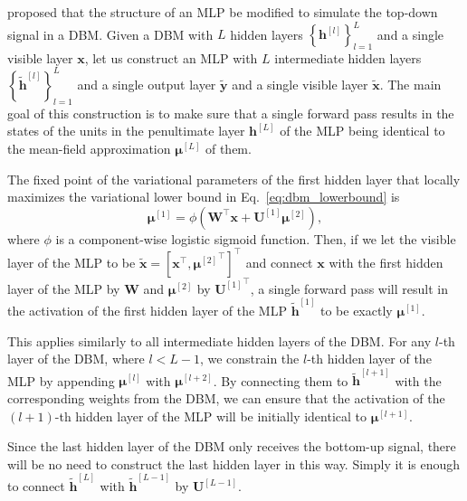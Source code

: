 \documentclass[dissertation,nocontribution,draft*]{aaltoseries}
\newcommand{\qlay}[1]{\left[#1\right]}
\newcommand{\vect}[1]{\mathbf{#1}}
\newcommand{\vects}[1]{\boldsymbol{#1}}
\newcommand{\matr}[1]{\mathbf{#1}}
\newcommand{\vh}[0]{\vect{h}}
\newcommand{\vx}[0]{\vect{x}}
\newcommand{\vy}[0]{\vect{y}}
\newcommand{\mW}[0]{\matr{W}}
\newcommand{\mU}[0]{\matr{U}}
\newcommand{\vmu}[0]{\vects{\mu}}
\begin{document}
\citet{Salakhutdinov2009a} proposed that the structure of an
MLP be modified to simulate the top-down signal in a DBM.
Given a DBM with $L$ hidden layers
$\left\{\vh^{\qlay{l}}\right\}_{l=1}^L$ and a single visible
layer $\vx$, let us construct an MLP with $L$ intermediate
hidden layers $\left\{\tilde{\vh}^{\qlay{l}}\right\}_{l=1}^L$ and
a single output layer $\tilde{\vy}$ and a single visible
layer $\tilde{\vx}$.
The main goal of this construction is to make sure that a
single forward pass results in the states of the units in
the penultimate layer $\vh^{\qlay{L}}$ of the MLP being identical
to the mean-field approximation $\vmu^{\qlay{L}}$ of them. 

The fixed point of the variational parameters of the first
hidden layer that locally maximizes the variational
lower bound in Eq.~\eqref{eq:dbm_lowerbound} is
\[
\vmu^{\qlay{1}} = \phi\left( \mW^\top \vx + \mU^{\qlay{1}} \vmu^{\qlay{2}} \right),
\]
where $\phi$ is a component-wise logistic sigmoid function.
Then, if we let the visible layer of the MLP to be
$\tilde{\vx} = \left[ \vx^\top, {\vmu^{\qlay{2}}}^\top
\right]^\top$ and connect $\vx$ with the first hidden layer
of the MLP by $\mW$ and $\vmu^{\qlay{2}}$ by ${\mU^{\qlay{1}}}^\top$,
a single forward pass will result in the activation of the
first hidden layer of the MLP $\tilde{\vh}^{\qlay{1}}$ to be
exactly $\vmu^{\qlay{1}}$.

This applies similarly to all intermediate hidden layers of
the DBM. For any $l$-th layer of the DBM, where $l < L - 1$,
we constrain the $l$-th hidden layer of the MLP by appending
$\vmu^{\qlay{l}}$ with $\vmu^{\qlay{l+2}}$. By connecting them to
$\tilde{\vh}^{\qlay{l+1}}$ with the corresponding weights from
the DBM, we can ensure that the activation of the $(l+1)$-th
hidden layer of the MLP will be initially identical to
$\vmu^{\qlay{l+1}}$. 

Since the last hidden layer of the DBM only receives the
bottom-up signal, there will be no need to construct the
last hidden layer in this way. 
Simply it is 
enough to connect $\tilde{\vh}^{\qlay{L}}$ with
$\tilde{\vh}^{\qlay{L-1}}$ by $\mU^{\qlay{L-1}}$.
\end{document}
